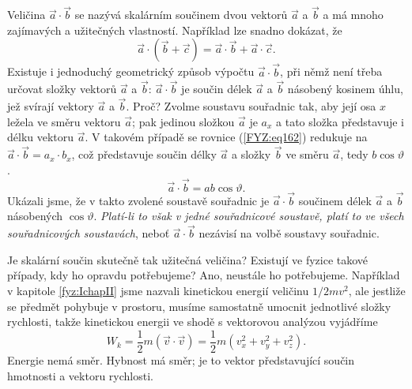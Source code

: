{    Veličina \(\vec{a}\cdot\vec{b}\) se nazývá skalárním součinem dvou vektorů \(\vec{a}\) a 
    \(\vec{b}\) a má mnoho zajímavých a užitečných vlastností. Například lze snadno dokázat, že
    \begin{equation}\label{FYZ:eq164}
      \vec{a}\cdot(\vec{b} + \vec{c}) =  \vec{a}\cdot\vec{b} + \vec{a}\cdot\vec{c}.
    \end{equation}
    Existuje i jednoduchý geometrický způsob výpočtu \(\vec{a}\cdot\vec{b}\), při němž není třeba 
    určovat složky vektorů \(\vec{a}\) a \(\vec{b}\): \(\vec{a}\cdot\vec{b}\) je součin délek 
    \(\vec{a}\) a \(\vec{b}\) násobený kosinem úhlu, jež svírají vektory \(\vec{a}\) a \(\vec{b}\). 
    Proč? Zvolme soustavu souřadnic tak, aby její osa \(x\) ležela ve směru vektoru \(\vec{a}\); 
    pak jedinou složkou \(\vec{a}\) je \(a_x\) a tato složka představuje i délku vektoru 
    \(\vec{a}\). V takovém případě se rovnice (\ref{FYZ:eq162}) redukuje na \(\vec{a}\cdot\vec{b} = 
    a_x\cdot b_x\), což představuje součin délky \(\vec{a}\) a složky \(\vec{b}\) ve směru 
    \(\vec{a}\), tedy \(b\cos\vartheta\).
    \begin{equation*}
      \vec{a}\cdot\vec{b} = ab\cos\vartheta.
    \end{equation*}
    Ukázali jsme, že v takto zvolené soustavě souřadnic je \(\vec{a}\cdot\vec{b}\) součinem délek 
    \(\vec{a}\) a \(\vec{b}\) násobených \(\cos\vartheta\). \emph{Platí-li to však v jedné 
    souřadnicové soustavě, platí to ve všech souřadnicových soustavách}, neboť 
    \(\vec{a}\cdot\vec{b}\) nezávisí na volbě soustavy souřadnic.
    
    Je skalární součin skutečně tak užitečná veličina? Existují ve fyzice takové případy, kdy ho 
    opravdu potřebujeme? Ano, neustále ho potřebujeme. Například v kapitole \ref{fyz:IchapII} jsme 
    nazvali kinetickou energií veličinu \(1/2 mv^2\), ale jestliže se předmět pohybuje v prostoru, 
    musíme samostatně umocnit jednotlivé složky rychlosti, takže kinetickou energii ve shodě s 
    vektorovou analýzou vyjádříme
    \begin{equation}\label{FYZ:eq165}
      W_k = \frac{1}{2}m(\vec{v}\cdot\vec{v}) = \frac{1}{2}m(v_x^2 + v_y^2 + v_z^2).
    \end{equation}
    Energie nemá směr. Hybnost má směr; je to vektor představující součin hmotnosti a vektoru rychlosti.
    
}
